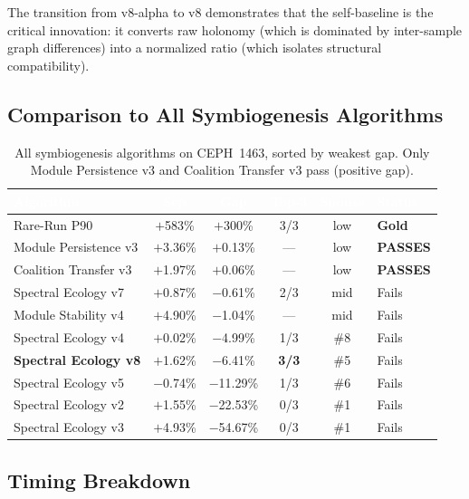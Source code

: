 \documentclass{../yalumba}
\begin{document}
The transition from v8-alpha to v8 demonstrates that the self-baseline
is the critical innovation: it converts raw holonomy (which is dominated
by inter-sample graph differences) into a normalized ratio (which isolates
structural compatibility).

\subsection{Comparison to All Symbiogenesis Algorithms}

\begin{table}[H]
  \centering
  \tablestyle
  \caption{All symbiogenesis algorithms on CEPH~1463, sorted by weakest gap.
    Only Module Persistence v3 and Coalition Transfer v3 pass (positive gap).}
  \label{tab:all}
  \begin{tabular}{lccccl}
    \toprule
    \rowcolor{table-header}
    \textcolor{white}{\textbf{Algorithm}} &
    \textcolor{white}{\textbf{Sep}} &
    \textcolor{white}{\textbf{Gap}} &
    \textcolor{white}{\textbf{Top-3}} &
    \textcolor{white}{\textbf{Spouse}} &
    \textcolor{white}{\textbf{Status}} \\
    \midrule
    Rare-Run P90
      & $+$583\% & $+$300\% & 3/3 & low & \textbf{Gold} \\
    Module Persistence v3
      & $+$3.36\% & $+$0.13\% & --- & low & \textbf{PASSES} \\
    Coalition Transfer v3
      & $+$1.97\% & $+$0.06\% & --- & low & \textbf{PASSES} \\
    Spectral Ecology v7
      & $+$0.87\% & $-$0.61\% & 2/3 & mid & Fails \\
    Module Stability v4
      & $+$4.90\% & $-$1.04\% & --- & mid & Fails \\
    Spectral Ecology v4
      & $+$0.02\% & $-$4.99\% & 1/3 & \#8 & Fails \\
    \textbf{Spectral Ecology v8}
      & $+$1.62\% & $-$6.41\% & \textbf{3/3} & \#5 & Fails \\
    Spectral Ecology v5
      & $-$0.74\% & $-$11.29\% & 1/3 & \#6 & Fails \\
    Spectral Ecology v2
      & $+$1.55\% & $-$22.53\% & 0/3 & \#1 & Fails \\
    Spectral Ecology v3
      & $+$4.93\% & $-$54.67\% & 0/3 & \#1 & Fails \\
    \bottomrule
  \end{tabular}
\end{table}

\subsection{Timing Breakdown}
\end{document}
